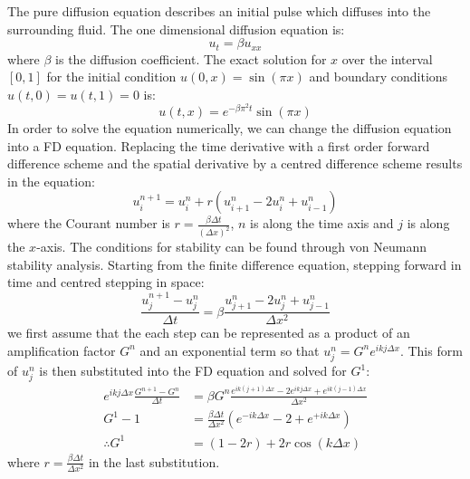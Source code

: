 \documentclass[twocolumn]{article}
\begin{document}
The pure diffusion equation describes an initial pulse which diffuses into
the surrounding fluid. The one dimensional diffusion equation is:
\begin{equation}
u_t = \beta u_{xx}
\end{equation}
where $\beta$ is the diffusion coefficient. The exact solution for $x$ over the
interval $\left[0, 1 \right]$ for the initial condition $u(0, x) = \sin(\pi x)$ and
boundary conditions $u(t, 0) = u(t, 1) = 0$ is:
\begin{equation}
\label{eq:diffusion}
u(t, x) = e^{- \beta \pi^2 t} \sin(\pi x)
\end{equation}
In order to solve the equation numerically, we can change the diffusion equation
into a FD equation. Replacing the time derivative with a first order forward
difference scheme and the spatial derivative by a centred difference scheme
results in the equation:
\begin{equation}
u_i^{n+1} = u_i^n + r \left( u_{i+1}^n - 2 u_i^n + u_{i-1}^n \right)
\end{equation}
where the Courant number is $r = \frac{\beta \Delta t}{(\Delta x)^2}$,
$n$ is along the time axis and $j$ is along the $x$-axis.
The conditions for stability can be found through von Neumann
stability analysis. Starting from the finite difference equation,
stepping forward in time and centred stepping in space:
\begin{equation}
\frac{u_j^{n+1} - u_j^n}{\Delta t} = \beta \frac{u_{j+1}^n - 2 u_j^n
	+ u_{j-1}^n}{\Delta x^2}
\end{equation}
we first assume that the each step can be represented as a product of
an amplification factor $G^n$ and an exponential term so that $u_j^n =
G^n e^{i k j \Delta x}$. This form of $u_j^n$ is then substituted into
the FD equation and solved for $G^1$:
\begin{equation}
\begin{aligned}
e^{i k j \Delta x} \frac{G^{n+1} - G^n}{\Delta t} &= \beta G^n
\frac{e^{i k (j + 1) \Delta x} - 2 e^{i k j \Delta x} + e^{i k (j
		- 1) \Delta x}}{\Delta x^2} \\
G^1 - 1 &= \frac{\beta \Delta t}{\Delta x^2} \left(e^{- i k \Delta
	x} - 2 + e^{+ i k \Delta x} \right) \\
\therefore G^1 &= \left( 1 - 2 r \right) + 2 r \cos(k \Delta x)
\end{aligned}
\end{equation}
where $r = \frac{\beta \Delta t}{\Delta x^2}$ in the last
substitution.
\end{document}
